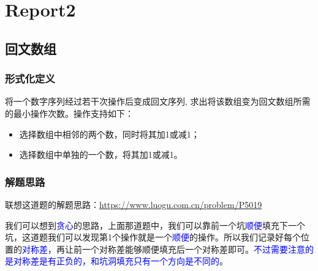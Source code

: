 \documentclass[../mainReport.tex]{subfiles}
\begin{document}
\section{Report2}
\subsection{回文数组}
\subsubsection{形式化定义}
将一个数字序列经过若干次操作后变成回文序列, 求出将该数组变为回文数组所需的最小操作次数。操作支持如下：
\begin{itemize}
    \item 选择数组中相邻的两个数，同时将其加1或减1；
    \item 选择数组中单独的一个数，将其加1或减1。
\end{itemize}

\subsubsection{解题思路}
联想这道题的解题思路：\url{https://www.luogu.com.cn/problem/P5019}

我们可以想到\textcolor{blue}{贪心}的思路，上面那道题中，我们可以靠前一个坑\textcolor{blue}{顺便}填充下一个坑，这道题我们可以发现第1个操作就是一个\textcolor{blue}{顺便}的操作。所以我们记录好每个位置的\textcolor{blue}{对称差}，再让前一个对称差能够顺便填充后一个对称差即可。\textcolor{blue}{不过需要注意的是对称差是有正负的，和坑洞填充只有一个方向是不同的}。





\end{document}
